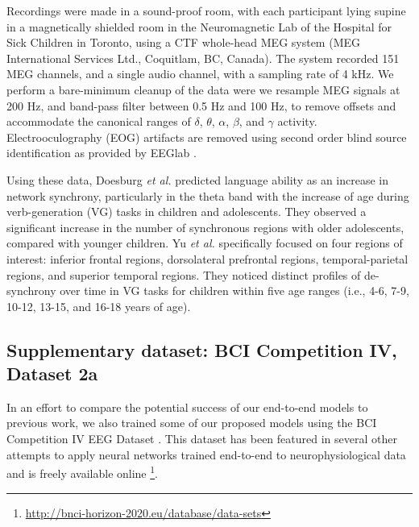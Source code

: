 \documentclass[fleqn,10pt]{wlscirep}
\begin{document}
Recordings were made in a sound-proof room, with each participant lying supine in a magnetically shielded room in the Neuromagnetic Lab of the Hospital for Sick Children in Toronto, using a CTF whole-head MEG system (MEG International Services Ltd., Coquitlam, BC, Canada). The system recorded 151 MEG channels, and a single audio channel, with a sampling rate of 4 kHz. We perform a bare-minimum cleanup of the data were we resample MEG signals at 200 Hz, and band-pass filter between 0.5 Hz and 100 Hz, to remove offsets and accommodate the canonical ranges of $\delta$, $\theta$, $\alpha$, $\beta$, and $\gamma$ activity. Electrooculography (EOG) artifacts are removed using second order blind source identification as provided by EEGlab \cite{Delorme04eeglab}.

Using these data, Doesburg {\em et al.} \cite{Doesburg2016} predicted language ability as an increase in network synchrony, particularly in the theta band with the increase of age during verb-generation (VG) tasks in children and adolescents. They observed a significant increase in the number of synchronous regions with older adolescents, compared with younger children. Yu {\em et al.} \cite{Yu2014} specifically focused on four regions of interest: inferior frontal regions, dorsolateral prefrontal regions, temporal-parietal regions, and superior temporal regions. They noticed distinct profiles of de-synchrony over time in VG tasks for children within five age ranges (i.e., 4-6, 7-9, 10-12, 13-15, and 16-18 years of age).

\subsection*{Supplementary dataset: BCI Competition IV, Dataset 2a}

In an effort to compare the potential success of our end-to-end models to previous work, we also trained some of our proposed models using the BCI Competition IV EEG Dataset \cite{Tangermann2012}. This dataset has been featured in several other attempts to apply neural networks trained end-to-end to neurophysiological data \cite{Schirrmeister2017,Tabar2017,Lawhern2017,Sun} and is freely available online \footnote{\url{http://bnci-horizon-2020.eu/database/data-sets}}.
\end{document}
